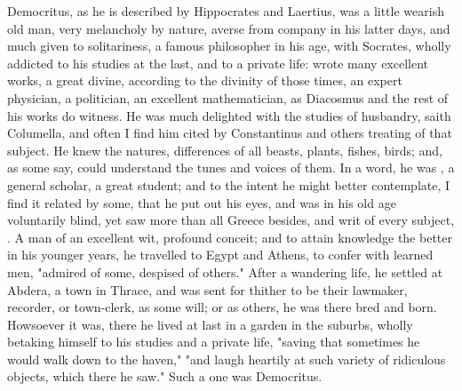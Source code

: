 Democritus, as he is described by Hippocrates and
Laertius, was a little wearish old man, very melancholy by
nature, averse from company in his latter days, and much
given to solitariness, a famous philosopher in his age,
 with Socrates, wholly
addicted to his studies at the last, and to a private life: wrote many
excellent works, a great divine, according to the divinity of those times, an
expert physician, a politician, an excellent mathematician, as
Diacosmus and the rest of his works do witness. He was much
delighted with the studies of husbandry, saith Columella,
and often I find him cited by Constantinus and others
treating of that subject. He knew the natures, differences of all beasts,
plants, fishes, birds; and, as some say, could understand
the tunes and voices of them. In a word, he was , a
general scholar, a great student; and to the intent he might better
contemplate, I find it related by some, that he put out his
eyes, and was in his old age voluntarily blind, yet saw more than all Greece
besides, and writ of every subject, . A man of an
excellent wit, profound conceit; and to attain knowledge the better in his
younger years, he travelled to Egypt and Athens, to confer
with learned men, "admired of some, despised of others."
After a wandering life, he settled at Abdera, a town in Thrace, and was sent
for thither to be their lawmaker, recorder, or town-clerk, as some will; or as
others, he was there bred and born. Howsoever it was, there he lived at last in
a garden in the suburbs, wholly betaking himself to his studies and a private
life, "saving that sometimes he would walk down to the
haven," "and laugh heartily at such variety of ridiculous
objects, which there he saw." Such a one was Democritus.

